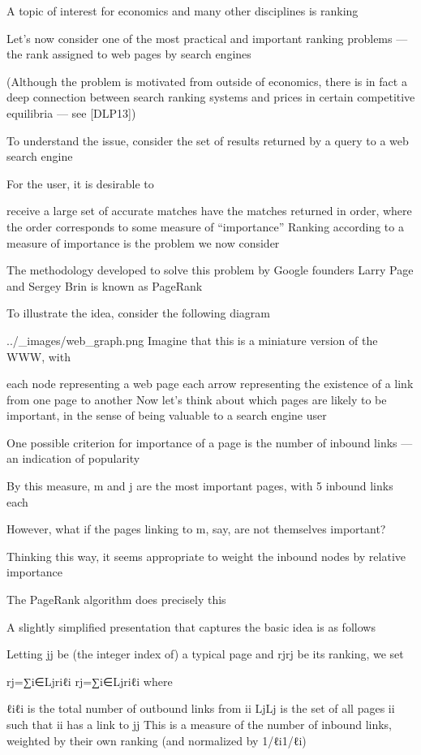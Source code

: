 A topic of interest for economics and many other disciplines is ranking

Let’s now consider one of the most practical and important ranking problems — the rank assigned to web pages by search engines

(Although the problem is motivated from outside of economics, there is in fact a deep connection between search ranking systems and prices in certain competitive equilibria — see [DLP13])

To understand the issue, consider the set of results returned by a query to a web search engine

For the user, it is desirable to

receive a large set of accurate matches
have the matches returned in order, where the order corresponds to some measure of “importance”
Ranking according to a measure of importance is the problem we now consider

The methodology developed to solve this problem by Google founders Larry Page and Sergey Brin is known as PageRank

To illustrate the idea, consider the following diagram

../_images/web_graph.png
Imagine that this is a miniature version of the WWW, with

each node representing a web page
each arrow representing the existence of a link from one page to another
Now let’s think about which pages are likely to be important, in the sense of being valuable to a search engine user

One possible criterion for importance of a page is the number of inbound links — an indication of popularity

By this measure, m and j are the most important pages, with 5 inbound links each

However, what if the pages linking to m, say, are not themselves important?

Thinking this way, it seems appropriate to weight the inbound nodes by relative importance

The PageRank algorithm does precisely this

A slightly simplified presentation that captures the basic idea is as follows

Letting jj be (the integer index of) a typical page and rjrj be its ranking, we set

rj=∑i∈Ljriℓi
rj=∑i∈Ljriℓi
where

ℓiℓi is the total number of outbound links from ii
LjLj is the set of all pages ii such that ii has a link to jj
This is a measure of the number of inbound links, weighted by their own ranking (and normalized by 1/ℓi1/ℓi)

